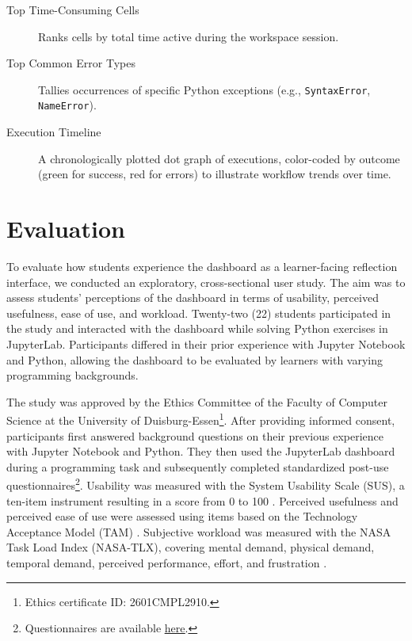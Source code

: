 \documentclass[acmsmall]{acmart}
\begin{document}
\begin{description}
    \item[Top Time-Consuming Cells] Ranks cells by total time active during the workspace session.

    \item[Top Common Error Types] Tallies occurrences of specific Python exceptions (e.g., \texttt{SyntaxError}, \texttt{NameError}).

    \item[Execution Timeline] A chronologically plotted dot graph of executions, color-coded by outcome (green for success, red for errors) to illustrate workflow trends over time.
\end{description}


\section{Evaluation}

To evaluate how students experience the dashboard as a learner-facing reflection interface, we conducted an exploratory, cross-sectional user study. The aim was to assess students' perceptions of the dashboard in terms of usability, perceived usefulness, ease of use, and workload. Twenty-two (22) students participated in the study and interacted with the dashboard while solving Python exercises in JupyterLab. Participants differed in their prior experience with Jupyter Notebook and Python, allowing the dashboard to be evaluated by learners with varying programming backgrounds.

The study was approved by the Ethics Committee of the Faculty of Computer Science at the University of Duisburg-Essen\footnote{Ethics certificate ID: 2601CMPL2910.}. After providing informed consent, participants first answered background questions on their previous experience with Jupyter Notebook and Python. They then used the JupyterLab dashboard during a programming task and subsequently completed standardized post-use questionnaires\footnote{Questionnaires are available \href{https://git.uni-due.de/colaps/la-rp/group-4/la-extension/-/raw/master/MUC\%20-\%20StudentResearchCompetition/Questionaire.pdf?ref_type=heads&inline=true}{\color{blue}\underline{here}}.}. Usability was measured with the System Usability Scale (SUS), a ten-item instrument resulting in a score from 0 to 100 \cite{germanupa_sus}. Perceived usefulness and perceived ease of use were assessed using items based on the Technology Acceptance Model (TAM) \cite{davis1989technology}. Subjective workload was measured with the NASA Task Load Index (NASA-TLX), covering mental demand, physical demand, temporal demand, perceived performance, effort, and frustration \cite{hart1988development}.
\end{document}
